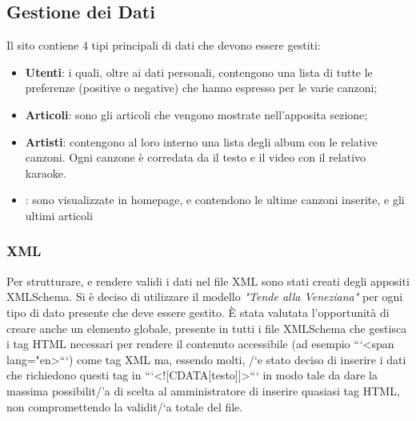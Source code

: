\subsection{Gestione dei Dati}
Il sito contiene 4 tipi principali di dati che devono essere gestiti:
\begin{itemize}
    \item \textbf{Utenti}: i quali, oltre ai dati personali, contengono una lista di tutte le preferenze (positive o negative) che hanno espresso per le varie canzoni;
    \item \textbf{Articoli}: sono gli articoli che vengono mostrate nell'apposita sezione;
    \item \textbf{Artisti}: contengono al loro interno una lista degli album con le relative canzoni. Ogni canzone \`e corredata da il testo e il video con il relativo karaoke.
    \item {}: sono visualizzate in homepage, e contendono le ultime canzoni inserite, e gli ultimi articoli
\end{itemize}

\subsubsection{XML}

Per strutturare, e rendere validi i dati nel file XML sono stati creati degli appositi XMLSchema.
Si \`e deciso di utilizzare il modello \textit{"Tende alla Veneziana"} per ogni tipo di dato presente che deve essere gestito.
\`E stata valutata l'opportunit\`a di creare anche un elemento globale, presente in tutti i file XMLSchema che gestisca i tag HTML necessari per rendere il contenuto accessibile (ad esempio ```<span lang="en>```) come tag XML ma, essendo molti, /`e stato deciso di inserire i dati che richiedono questi tag in ```<![CDATA[testo]]>``` in modo tale da dare la massima possibilit/'a di scelta al amministratore di inserire quasiasi tag HTML, non compromettendo la validit/`a totale del file.